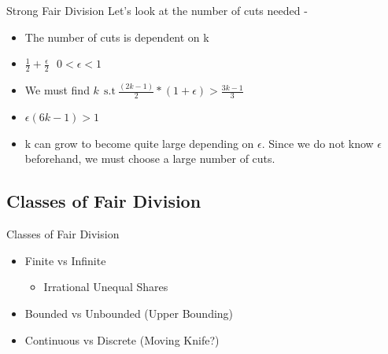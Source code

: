 \documentclass[aspectratio=169,xcolor=dvipsnames]{beamer}
\begin{document}
\begin{frame}{Strong Fair Division}
	Let's look at the number of cuts needed - 
	\begin{itemize}
		\item The number of cuts is dependent on k
		\item $\frac{1}{2} + \frac{\epsilon}{2}~~~0 < \epsilon < 1$
		\item We must find $k~~\text{s.t}~\frac{(2k-1)}{2}\ast (1+\epsilon) > \frac{3k-1}{3}$
		\item $\epsilon (6k-1) > 1 $
		\item k can grow to become quite large depending on $\epsilon$. Since we do not know $\epsilon$ beforehand, we must choose a large number of cuts.
	\end{itemize}
\end{frame} %
\subsection{Classes of Fair Division}
\begin{frame}{Classes of Fair Division}
	\begin{itemize}
		\item Finite vs Infinite 
		\begin{itemize}
			\item Irrational Unequal Shares
		\end{itemize}\pause
		\item Bounded vs Unbounded (Upper Bounding)\pause
		\item Continuous vs Discrete (Moving Knife?)
	\end{itemize}
\end{frame}
\end{document}
